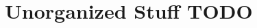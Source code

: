 \documentclass{article}
\theoremstyle{definition}
\theoremstyle{plain}
\begin{document}
\section{Unorganized Stuff TODO}

\end{document}
